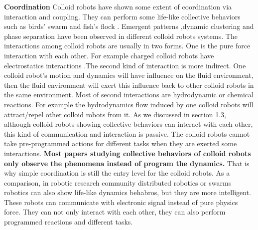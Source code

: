 \textbf{Coordination}  Colloid robots have shown some extent of coordination via interaction and coupling. They can perform some life-like collective behaviors such as  birds' swarm and fish's flock \cite{wang2015one,ginot2018aggregation}. Emergent patterns ,dynamic clustering and phase separation have been observed  in different colloid robots systems. \cite{buttinoni2013dynamical,ginot2018aggregation,duan2013transition,theurkauff2012dynamic} The interactions among colloid robots are usually in two forms. One is the pure force interaction with each other. For example charged colloid robots have electrostatics interactions \cite{dou2018emergence}.The second kind of interaction is more indirect. One colloid robot's motion and dynamics  will have influence on the fluid environment, then  the fluid environment will exert this influence back to other colloid robots in the same environment. Most of second interactions are hydrodynamic or chemical reactions. For example the hydrodynamics flow induced by one colloid robots will attract/repel other colloid robots from it. \cite{karani2019tuning} As we discussed in section 1.3, although colloid robots showing collective behaviors can interact with each other, this kind of communication and interaction is passive. The colloid robots cannot take pre-programmed actions for different tasks when they are exerted some interactions. \textbf{Most papers studying collective behaviors of colloid robots only observe the phenomena instead of  program the dynamics.} That is why simple coordination is still the entry level for the colloid robots. As a comparison, in robotic research community  distributed robotics or  swarms robotics\cite{wei2010sambot,arvin2014colias} can also show life-like dynamics behabros, but they are more intelligent. These robots can communicate with electronic signal instead of pure physics force. They can not only interact with each other, they can also perform programmed reactions and different tasks.\cite{rubenstein2012kilobot,rubenstein2014programmable,li2019particle}

